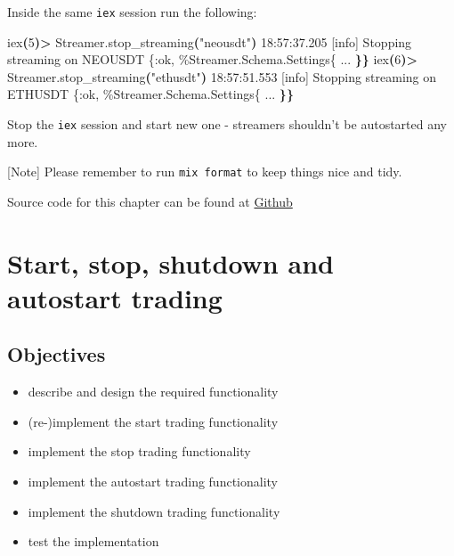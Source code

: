 \documentclass[
  oneside]{book}
\newenvironment{Shaded}{\begin{snugshade}}{\end{snugshade}}
\newcommand{\ErrorTok}[1]{\textcolor[rgb]{0.64,0.00,0.00}{\textbf{#1}}}
\newcommand{\ExtensionTok}[1]{#1}
\newcommand{\KeywordTok}[1]{\textcolor[rgb]{0.13,0.29,0.53}{\textbf{#1}}}
\newcommand{\NormalTok}[1]{#1}
\newcommand{\OperatorTok}[1]{\textcolor[rgb]{0.81,0.36,0.00}{\textbf{#1}}}
\newcommand{\StringTok}[1]{\textcolor[rgb]{0.31,0.60,0.02}{#1}}
\providecommand{\tightlist}{%
  \setlength{\itemsep}{0pt}\setlength{\parskip}{0pt}}
\begin{document}
Inside the same \texttt{iex} session run the following:

\begin{Shaded}
\begin{Highlighting}[]
\ExtensionTok{iex}\ErrorTok{(}\ExtensionTok{5}\KeywordTok{)}\OperatorTok{\textgreater{}}\NormalTok{ Streamer.stop\_streaming}\KeywordTok{(}\StringTok{"neousdt"}\KeywordTok{)} 
\ExtensionTok{18:57:37.205}\NormalTok{ [info]  Stopping streaming on NEOUSDT}
\ExtensionTok{\{:ok,}
 \ExtensionTok{\%Streamer.Schema.Settings\{}
   \ExtensionTok{...}
 \ErrorTok{\}\}}
\ExtensionTok{iex}\ErrorTok{(}\ExtensionTok{6}\KeywordTok{)}\OperatorTok{\textgreater{}}\NormalTok{ Streamer.stop\_streaming}\KeywordTok{(}\StringTok{"ethusdt"}\KeywordTok{)}
\ExtensionTok{18:57:51.553}\NormalTok{ [info]  Stopping streaming on ETHUSDT}
\ExtensionTok{\{:ok,}
 \ExtensionTok{\%Streamer.Schema.Settings\{}
   \ExtensionTok{...}
 \ErrorTok{\}\}}
\end{Highlighting}
\end{Shaded}

Stop the \texttt{iex} session and start new one - streamers shouldn't be autostarted any more.

{[}Note{]} Please remember to run \texttt{mix\ format} to keep things nice and tidy.

Source code for this chapter can be found at \href{https://github.com/frathon/create-a-cryptocurrency-trading-bot-in-elixir-source-code/tree/chapter_11}{Github}

\hypertarget{start-stop-shutdown-and-autostart-trading}{%
\chapter{Start, stop, shutdown and autostart trading}\label{start-stop-shutdown-and-autostart-trading}}

\hypertarget{objectives-11}{%
\section{Objectives}\label{objectives-11}}

\begin{itemize}
\tightlist
\item
  describe and design the required functionality
\item
  (re-)implement the start trading functionality
\item
  implement the stop trading functionality
\item
  implement the autostart trading functionality
\item
  implement the shutdown trading functionality
\item
  test the implementation
\end{itemize}
\end{document}
